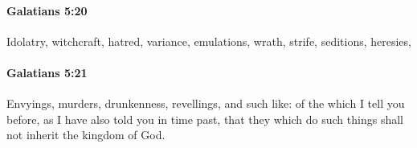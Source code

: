 		\paragraph{Galatians 5:20} %
			\label{GALATIANS-5-20}

			Idolatry, witchcraft, hatred, variance, emulations, wrath, strife, seditions, heresies,

			\begin{framed}
			\scriptsize
				\begin{compactdesc}
					\item[SBLG] 
				\end{compactdesc}
			\end{framed}

		\paragraph{Galatians 5:21} %
			\label{GALATIANS-5-21}

			Envyings, murders, drunkenness, revellings, and such like: of the which I tell you before, as I have also told you in time past, that they which do such things shall not inherit the kingdom of God.

